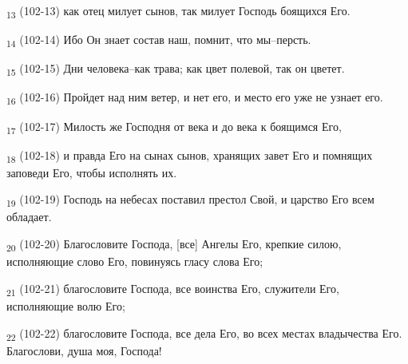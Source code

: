 \begin{tcolorbox}
\textsubscript{13} (102-13) как отец милует сынов, так милует Господь боящихся Его.
\end{tcolorbox}
\begin{tcolorbox}
\textsubscript{14} (102-14) Ибо Он знает состав наш, помнит, что мы--персть.
\end{tcolorbox}
\begin{tcolorbox}
\textsubscript{15} (102-15) Дни человека--как трава; как цвет полевой, так он цветет.
\end{tcolorbox}
\begin{tcolorbox}
\textsubscript{16} (102-16) Пройдет над ним ветер, и нет его, и место его уже не узнает его.
\end{tcolorbox}
\begin{tcolorbox}
\textsubscript{17} (102-17) Милость же Господня от века и до века к боящимся Его,
\end{tcolorbox}
\begin{tcolorbox}
\textsubscript{18} (102-18) и правда Его на сынах сынов, хранящих завет Его и помнящих заповеди Его, чтобы исполнять их.
\end{tcolorbox}
\begin{tcolorbox}
\textsubscript{19} (102-19) Господь на небесах поставил престол Свой, и царство Его всем обладает.
\end{tcolorbox}
\begin{tcolorbox}
\textsubscript{20} (102-20) Благословите Господа, [все] Ангелы Его, крепкие силою, исполняющие слово Его, повинуясь гласу слова Его;
\end{tcolorbox}
\begin{tcolorbox}
\textsubscript{21} (102-21) благословите Господа, все воинства Его, служители Его, исполняющие волю Его;
\end{tcolorbox}
\begin{tcolorbox}
\textsubscript{22} (102-22) благословите Господа, все дела Его, во всех местах владычества Его. Благослови, душа моя, Господа!
\end{tcolorbox}
